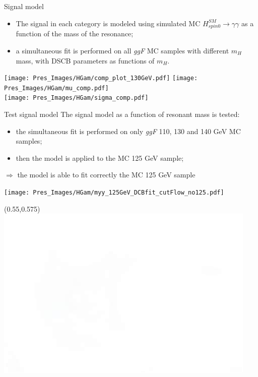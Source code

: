 \documentclass[10pt,UKenglish, leqno, xcolor = dvipsnames]{beamer}
\begin{document}
	\begin{frame}{Signal model}
		\vfill
		\begin{itemize}
			\item The signal in each category is modeled using simulated MC $H^{SM}_{spin0}\to\gamma\gamma$ as a function of the mass of the resonance;
			\item a simultaneous fit is performed on all \textit{ggF} MC samples with different $m_H$ mass, with DSCB parameters as functions of $m_H$.
		\end{itemize}
		\centering
		\texttt{[image: Pres\_Images/HGam/comp\_plot\_130GeV.pdf]}
		\texttt{[image: Pres\_Images/HGam/mu\_comp.pdf]}\\
		\texttt{[image: Pres\_Images/HGam/sigma\_comp.pdf]}\\
		\vfill
	\end{frame}
	
	\begin{frame}{Test signal model}
		\vfill
		The signal model as a function of resonant mass is tested:
		\begin{itemize}
			\item the simultaneous fit is performed on only \textit{ggF} 110, 130 and 140 GeV MC samples;
			\item then the model is applied to the MC 125 GeV sample;
		\end{itemize}
		
		\vspace{.5cm}
		\begin{center}
			$\Rightarrow$ the model is able to fit correctly the MC 125 GeV sample
			
			\texttt{[image: Pres\_Images/HGam/myy\_125GeV\_DCBfit\_cutFlow\_no125.pdf]}
		\end{center}
		\vfill
		\begin{textblock}{}(0.55,0.575)
			\includegraphics[width=.2\textwidth]{Pres_Images/HGam/white.jpeg}
		\end{textblock}
	\end{frame}
	
\end{document}
